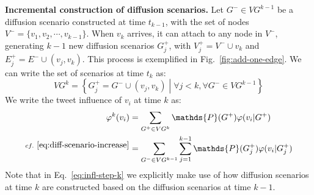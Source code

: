 \textbf{Incremental construction of diffusion scenarios.}
Let $G^- \in VG^{k-1}$ be a diffusion scenario constructed at time $t_{k-1}$, with the set of nodes $V^- = \{ v_1,v_2,\cdots,v_{k-1} \}$.
When $v_k$ arrives, it can attach to any node in $V^-$, generating $k-1$ new diffusion scenarios $G_j^+$, with $V_j^+ = V^- \cup v_k$ and $E_j^+ = E^- \cup (v_j, v_k)$.
This process is exemplified in Fig.~\ref{fig:add-one-edge}.
We can write the set of scenarios at time $t_k$ as:
\begin{equation} \label{eq:diff-scenario-increase}
	VG^k = \left\lbrace G_j^+ = G^- \cup (v_j, v_k) \middle| \forall j < k, \forall G^- \in VG^{k-1} \right\rbrace
\end{equation}
We write the tweet influence of $v_i$ at time $k$ as:
%
%
%
\begin{align}
	\varphi^k(v_i) &= \sum_{G^+ \in {VG^k}} \mathds{P}(G^+) \varphi(v_i|G^+) \nonumber \\
	^{cf.~\eqref{eq:diff-scenario-increase}} &= \sum_{G^- \in {VG^{k-1}}}\sum^{k-1}_{j=1}\mathds{P}(G_j^+) \varphi(v_i|G_j^+) \label{eq:infl-step-k}
\end{align}
Note that in Eq.~\eqref{eq:infl-step-k} we explicitly make use of how diffusion scenarios at time $k$ are constructed based on the diffusion scenarios at time $k-1$.

